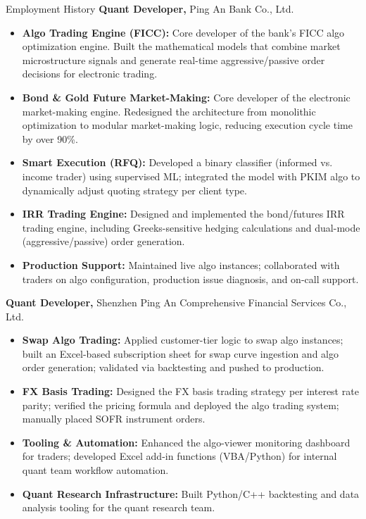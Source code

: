 \begin{rubric}{Employment History}
\entry*[2023 -- Present]%
	\textbf{Quant Developer,} Ping An Bank Co., Ltd.%
	\begin{itemize}
		\item \textbf{Algo Trading Engine (FICC):} Core developer of the bank's FICC algo optimization engine. Built the mathematical models that combine market microstructure signals and generate real-time aggressive/passive order decisions for electronic trading.
		\item \textbf{Bond \& Gold Future Market-Making:} Core developer of the electronic market-making engine. Redesigned the architecture from monolithic optimization to modular market-making logic, reducing execution cycle time by over 90\%.
		\item \textbf{Smart Execution (RFQ):} Developed a binary classifier (informed vs. income trader) using supervised ML; integrated the model with PKIM algo to dynamically adjust quoting strategy per client type.
		\item \textbf{IRR Trading Engine:} Designed and implemented the bond/futures IRR trading engine, including Greeks-sensitive hedging calculations and dual-mode (aggressive/passive) order generation.
		\item \textbf{Production Support:} Maintained live algo instances; collaborated with traders on algo configuration, production issue diagnosis, and on-call support.
	\end{itemize}%

\entry*[2021 -- 2023]%
	\textbf{Quant Developer,} Shenzhen Ping An Comprehensive Financial Services Co., Ltd.%
	\begin{itemize}
		\item \textbf{Swap Algo Trading:} Applied customer-tier logic to swap algo instances; built an Excel-based subscription sheet for swap curve ingestion and algo order generation; validated via backtesting and pushed to production.
		\item \textbf{FX Basis Trading:} Designed the FX basis trading strategy per interest rate parity; verified the pricing formula and deployed the algo trading system; manually placed SOFR instrument orders.
		\item \textbf{Tooling \& Automation:} Enhanced the algo-viewer monitoring dashboard for traders; developed Excel add-in functions (VBA/Python) for internal quant team workflow automation.
		\item \textbf{Quant Research Infrastructure:} Built Python/C++ backtesting and data analysis tooling for the quant research team.
	\end{itemize}%

\end{rubric}